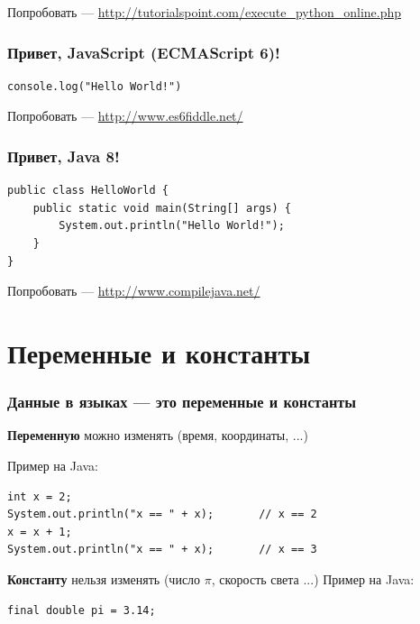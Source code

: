 {\begin{frame}[fragile]
  \vspace{2cm}
  Попробовать --- \url{http://tutorialspoint.com/execute\_python\_online.php}
\end{frame}

\begin{frame}[fragile]
  \frametitle{Привет, JavaScript (ECMAScript 6)!}
  \begin{verbatim}
console.log("Hello World!")
  \end{verbatim}

  \vspace{2cm}
  Попробовать --- \url{http://www.es6fiddle.net/}
\end{frame}

\begin{frame}[fragile]
  \frametitle{Привет, Java 8!}
  \begin{verbatim}
public class HelloWorld {
    public static void main(String[] args) {
        System.out.println("Hello World!");
    }
}
  \end{verbatim}

  \vspace{2cm}
  Попробовать --- %
\url{http://www.compilejava.net/}
\end{frame}

\section{Переменные и константы}
\begin{frame}[fragile]
  \frametitle{Данные в языках --- это переменные и константы}
  \textbf{Переменную} можно изменять (время, координаты, ...)

  Пример на Java:
  \begin{verbatim}
int x = 2;
System.out.println("x == " + x);       // x == 2
x = x + 1;
System.out.println("x == " + x);       // x == 3
  \end{verbatim}
  \vspace{1cm}
  \textbf{Константу} нельзя изменять (число $\pi$, скорость света ...)
  Пример на Java:
  \begin{verbatim}
final double pi = 3.14;
  \end{verbatim}
\end{frame}

}
